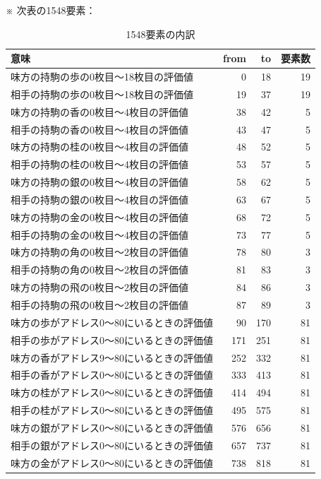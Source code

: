 \documentclass[10pt,a4paper]{ltjsarticle}
\begin{document}
※ 次表の1548要素：
\begin{table}[H]
  \centering
  \caption{1548要素の内訳}
  \small
  \begin{tabular}{lrrr}
    意味 & from & to & 要素数 \\ \hline
    味方の持駒の歩の0枚目～18枚目の評価値 &  0 & 18 & 19 \\
    相手の持駒の歩の0枚目～18枚目の評価値 & 19 & 37 & 19 \\
    味方の持駒の香の0枚目～4枚目の評価値  & 38 & 42 &  5 \\
    相手の持駒の香の0枚目～4枚目の評価値  & 43 & 47 &  5 \\
    味方の持駒の桂の0枚目～4枚目の評価値  & 48 & 52 &  5 \\
    相手の持駒の桂の0枚目～4枚目の評価値  & 53 & 57 &  5 \\
    味方の持駒の銀の0枚目～4枚目の評価値  & 58 & 62 &  5 \\
    相手の持駒の銀の0枚目～4枚目の評価値  & 63 & 67 &  5 \\
    味方の持駒の金の0枚目～4枚目の評価値  & 68 & 72 &  5 \\
    相手の持駒の金の0枚目～4枚目の評価値  & 73 & 77 &  5 \\
    味方の持駒の角の0枚目～2枚目の評価値  & 78 & 80 &  3 \\
    相手の持駒の角の0枚目～2枚目の評価値  & 81 & 83 &  3 \\
    味方の持駒の飛の0枚目～2枚目の評価値  & 84 & 86 &  3 \\
    相手の持駒の飛の0枚目～2枚目の評価値  & 87 & 89 &  3 \\
    味方の歩がアドレス0～80にいるときの評価値 &   90 &  170 & 81 \\
    相手の歩がアドレス0～80にいるときの評価値 &  171 &  251 & 81 \\
    味方の香がアドレス9～80にいるときの評価値 &  252 &  332 & 81 \\
    相手の香がアドレス0～80にいるときの評価値 &  333 &  413 & 81 \\
    味方の桂がアドレス0～80にいるときの評価値 &  414 &  494 & 81 \\
    相手の桂がアドレス0～80にいるときの評価値 &  495 &  575 & 81 \\
    味方の銀がアドレス0～80にいるときの評価値 &  576 &  656 & 81 \\
    相手の銀がアドレス0～80にいるときの評価値 &  657 &  737 & 81 \\
    味方の金がアドレス0～80にいるときの評価値 &  738 &  818 & 81 \\

\end{tabular}
\end{table}
\end{document}
